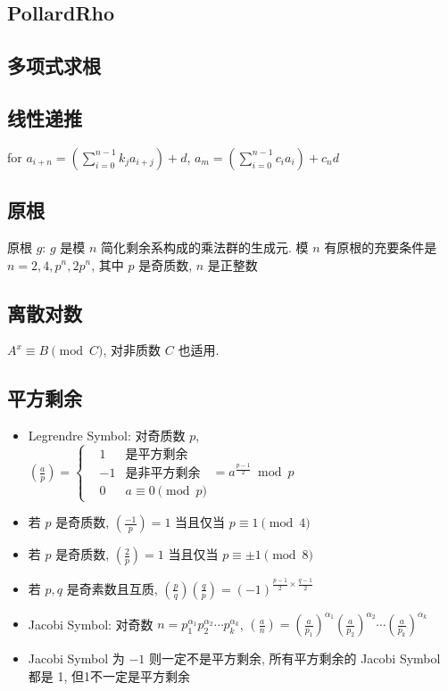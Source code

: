 \documentclass[landscape, twocolumn, 8pt, a4paper, twoside]{extarticle}
\begin{document}
\subsection{PollardRho}


\subsection{多项式求根}


\subsection{线性递推}
for $a_{i + n} = (\sum_{i = 0}^{n - 1} k_j a_{i + j}) + d$,
$a_m = (\sum_{i = 0}^{n - 1} c_i a_i) + c_n d$


\subsection{原根}
原根 $g$: $g$ 是模 $n$ 简化剩余系构成的乘法群的生成元.
模 $n$ 有原根的充要条件是 $n = 2, 4, p^n, 2p^n$, 其中 $p$ 是奇质数, $n$ 是正整数


\subsection{离散对数}
$A ^ x \equiv B \pmod{C}$, 对非质数 $C$ 也适用.


\subsection{平方剩余}
\begin{itemize}
\item Legrendre Symbol: 对奇质数 $p$, $(\frac{a}{p}) =
  \left\{
    \begin{aligned}
      &  1 & \textrm{是平方剩余} \\
      & -1 & \textrm{是非平方剩余} \\
      &  0 & \textrm{$a \equiv 0 \pmod{p}$}
    \end{aligned}
  \right.
  = a^{\frac{p - 1}{2}} \bmod{p} $
\item 若 $p$ 是奇质数, $(\frac{-1}{p}) = 1$ 当且仅当 $p \equiv 1 \pmod{4}$
\item 若 $p$ 是奇质数, $(\frac{ 2}{p}) = 1$ 当且仅当 $p \equiv \pm 1 \pmod{8}$
\item 若 $p, q$ 是奇素数且互质, $(\frac{p}{q})(\frac{q}{p}) = (-1)^{\frac{p - 1}{2} \times \frac{q - 1}{2}}$
\item Jacobi Symbol: 对奇数 $n = p_1^{\alpha_1} p_2^{\alpha_2} \cdots p_k ^ {\alpha_k} $, 
  $(\frac{a}{n}) = (\frac{a}{p_1})^{\alpha_1} (\frac{a}{p_2})^{\alpha_2} \cdots (\frac{a}{p_k})^{\alpha_k}$
\item Jacobi Symbol 为 $-1$ 则一定不是平方剩余, 所有平方剩余的 Jacobi Symbol 都是 1, 但1不一定是平方剩余
\end{itemize}
\end{document}
